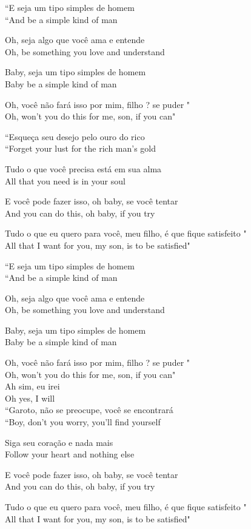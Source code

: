 ``E seja um tipo simples de homem \\
``And be a simple kind of man

Oh, seja algo que você ama e entende \\
Oh, be something you love and understand

Baby, seja um tipo simples de homem \\
Baby be a simple kind of man

Oh, você não fará isso por mim, filho ? se puder " \\
Oh, won't you do this for me, son, if you can"

``Esqueça seu desejo pelo ouro do rico \\
``Forget your lust for the rich man's gold

Tudo o que você precisa está em sua alma \\
All that you need is in your soul

E você pode fazer isso, oh baby, se você tentar \\
And you can do this, oh baby, if you try

Tudo o que eu quero para você, meu filho, é que fique satisfeito " \\
All that I want for you, my son, is to be satisfied"

``E seja um tipo simples de homem \\
``And be a simple kind of man

Oh, seja algo que você ama e entende \\
Oh, be something you love and understand

Baby, seja um tipo simples de homem \\
Baby be a simple kind of man

Oh, você não fará isso por mim, filho ? se puder " \\
Oh, won't you do this for me, son, if you can" \\
Ah sim, eu irei \\
Oh yes, I will \\
``Garoto, não se preocupe, você se encontrará \\
``Boy, don't you worry, you'll find yourself

Siga seu coração e nada mais \\
Follow your heart and nothing else

E você pode fazer isso, oh baby, se você tentar \\
And you can do this, oh baby, if you try

Tudo o que eu quero para você, meu filho, é que fique satisfeito " \\
All that I want for you, my son, is to be satisfied"

